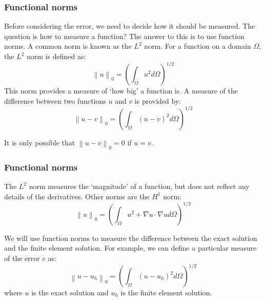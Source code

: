 \documentclass[notes]{beamer}
\begin{document}
\begin{frame}
\frametitle{Functional norms}
Before considering the error, we need to decide how it should be measured. The question
is how to measure a function? The answer to this is to use function norms. A common
norm is known as the $L^2$ norm. For a function on a domain $\Omega$, the $L^2$ norm is defined
as:
	\begin{equation*}
	\left\lVert u \right\rVert_0 = \left(\int_\Omega u^2 d\Omega \right)^{1/2}
	\end{equation*}
This norm provides a measure of ‘how big’ a function is. A measure of the difference
between two functions $u$ and $v$ is provided by:
	\begin{equation*}
	\left\lVert u - v \right\rVert_0 = \left(\int_\Omega (u-v)^2 d\Omega \right)^{1/2}
	\end{equation*}
	
It is only possible that $\left\lVert u - v \right\rVert_0  = 0$ if $u = v$.
\end{frame}

\begin{frame}
\frametitle{Functional norms}
The $L^2$ norm measures the `magnitude' of a function, but does not reflect any details of
the derivatives. Other norms are the $H^1$ norm:
	\begin{equation*}
	\left\lVert u \right\rVert_0 = \left(\int_\Omega u^2 + \nabla u \cdot \nabla u d\Omega \right)^{1/2}
	\end{equation*}

We will use function norms to measure the difference between the exact solution and
the finite element solution. For example, we can define a particular measure of the error
$e$ as:
	\begin{equation*}
	\left\lVert u - u_h \right\rVert_0 = \left(\int_\Omega (u-u_h)^2 d\Omega \right)^{1/2}
	\end{equation*}
	where $u$ is the exact solution and $u_h$ is the finite element solution.
\end{frame}
\end{document}
